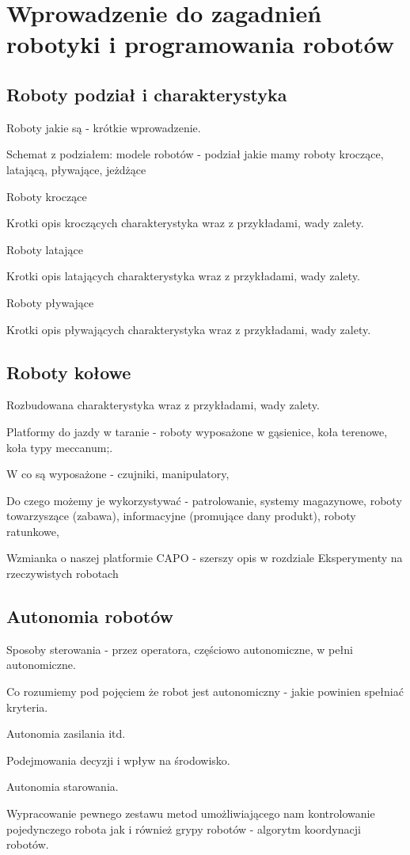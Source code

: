 \chapter{Wprowadzenie do zagadnień robotyki i programowania robotów}

\section{Roboty podział i charakterystyka}

Roboty jakie są - krótkie wprowadzenie.  

Schemat z podziałem: modele robotów - podział jakie mamy roboty kroczące, latającą, pływające, jeżdżące 


Roboty kroczące

Krotki opis kroczących charakterystyka wraz z przykładami, wady zalety.

Roboty latające

Krotki opis latających charakterystyka wraz z przykładami, wady zalety.

Roboty pływające

Krotki opis pływających charakterystyka wraz z przykładami, wady zalety.


\section{Roboty kołowe}

Rozbudowana charakterystyka wraz z przykładami, wady zalety.

Platformy do jazdy w taranie - roboty wyposażone w gąsienice, koła terenowe, koła typy meccanum;.

W co są wyposażone - czujniki, manipulatory, 

Do czego możemy je wykorzystywać - patrolowanie, systemy magazynowe, roboty towarzyszące (zabawa), informacyjne (promujące dany produkt), roboty ratunkowe, 

Wzmianka o naszej platformie CAPO - szerszy opis w rozdziale Eksperymenty na rzeczywistych robotach


\section{Autonomia robotów}

Sposoby sterowania - przez operatora, częściowo autonomiczne, w pełni autonomiczne.

Co rozumiemy pod pojęciem że robot jest autonomiczny - jakie powinien spełniać kryteria.

Autonomia zasilania itd.

Podejmowania decyzji i wpływ na środowisko.

Autonomia starowania.

Wypracowanie pewnego zestawu metod umożliwiającego nam kontrolowanie pojedynczego robota jak i również grypy robotów - algorytm koordynacji robotów.


